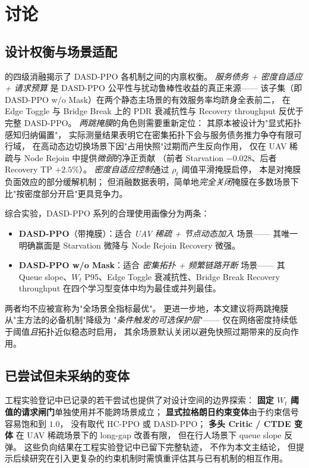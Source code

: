 \section{讨论}
\label{sec:discussion}

\subsection{设计权衡与场景适配}

 的四级消融揭示了 DASD-PPO 各机制之间的内禀权衡。
\emph{服务债务 + 密度自适应 + 请求预算}
是 DASD-PPO 公平性与扰动鲁棒性收益的真正来源——
该子集（即 DASD-PPO w/o Mask）在两个静态主场景的有效服务率均跻身全表前二，
在 Edge Toggle 与 Bridge Break 上的 PDR 衰减抗性与 Recovery throughput 反优于完整 DASD-PPO。
\emph{两跳掩膜}的角色则需要重新定位：
其原本被设计为"显式拓扑感知归纳偏置"，
实际测量结果表明它在密集拓扑下会与服务债务推力争夺有限可行域，
在高动态边切换场景下因"占用快照"过期而产生反向作用，
仅在 UAV 稀疏与 Node Rejoin 中提供\emph{微弱}的净正贡献
（前者 Starvation \(-0.028\)、后者 Recovery TP \(+2.5\%\)）。
\emph{密度自适应控制}通过 \(\rho_t\) 阈值平滑掩膜启停，
本是对掩膜负面效应的部分缓解机制；
但消融数据表明，简单地\emph{完全关闭}掩膜在多数场景下比"按密度部分开启"更具竞争力。

综合实验，DASD-PPO 系列的合理使用画像分为两条：
\begin{itemize}
\item \textbf{DASD-PPO}（带掩膜）：适合 \emph{UAV 稀疏 + 节点动态加入} 场景——
  其唯一明确赢面是 Starvation 微降与 Node Rejoin Recovery 微强。
\item \textbf{DASD-PPO w/o Mask}：适合 \emph{密集拓扑 + 频繁链路开断} 场景——
  其 Queue slope、\(W_t\) P95、Edge Toggle 衰减抗性、Bridge Break Recovery throughput
  在四个学习型变体中均为最佳或并列最佳。
\end{itemize}
两者均不应被宣称为"全场景全指标最优"。
更进一步地，本文建议将两跳掩膜从"主方法的必备机制"降级为
"\emph{条件触发的可选保护层}"——
仅在网络密度持续低于阈值\emph{且}拓扑近似稳态时启用，
其余场景默认关闭以避免快照过期带来的反向作用。

\subsection{已尝试但未采纳的变体}

\sloppy
工程实验登记中已记录的若干尝试也提供了对设计空间的边界探索：
\textbf{固定 \(W_t\) 阈值的请求闸门}单独使用并不能跨场景成立；
\textbf{显式拉格朗日约束变体}由于约束信号容易饱和到 \(1.0\)，
没有取代 HC-PPO 或 DASD-PPO；
\textbf{多头 Critic / CTDE 变体}
在 UAV 稀疏场景下的 long-gap 改善有限，
但在行人场景下 queue slope 反弹。
这些负向结果在工程实验登记中已留下完整轨迹，
不作为本文主结论，
但提示后续研究在引入更复杂的约束机制时需慎重评估其与已有机制的相互作用。
\fussy

